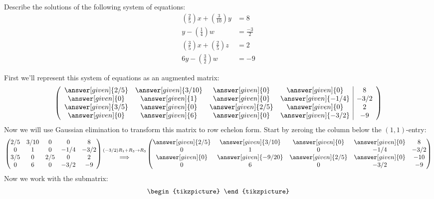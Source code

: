 \documentclass{ximera}
\begin{document}
\begin{example}
  Describe the solutions of the following system of equations:
\begin{align*}
\left(\frac{2}{5}\right)x + \left(\frac{3}{10}\right) y &= 8\\
y -\left(\frac{1}{4}\right)w &= \frac{-3}{2}\\
\left(\frac{3}{5}\right)x + \left(\frac{2}{5}\right)z &= 2\\
6y - \left(\frac{3}{2}\right)w &= -9
\end{align*}
\begin{explanation}
First we'll represent this system of equations as an augmented matrix:
\[
  \left(\begin{array}{cccc|c}
   \answer[given]{2/5}&  \answer[given]{3/10} & \answer[given]{0} &\answer[given]{0} &8 \\
  \answer[given]{0}&  \answer[given]{1} & \answer[given]{0} &\answer[given]{-1/4} & -3/2\\
  \answer[given]{3/5}&  \answer[given]{0} & \answer[given]{2/5} &\answer[given]{0} &2\\
  \answer[given]{0}&  \answer[given]{6} & \answer[given]{0} &\answer[given]{-3/2} &-9
\end{array}\right)
\]
Now we will use Gaussian elimination to transform this matrix to row echelon form. Start by zeroing the column below the $(1,1)$-entry:
\[
\begin{pmatrix}
   {2/5}&  {3/10} & {0} &{0} &8 \\
  {0}&  {1} & {0} &{-1/4} & -3/2\\
  {3/5}&  {0} & {2/5} &{0} &2\\
  {0}&  {6} & {0} &{-3/2} &-9
\end{pmatrix}
\begin{matrix}
  \scriptstyle(-3/2) R_1 + R_3\to R_3\\
  \Longrightarrow
\end{matrix}
\begin{pmatrix}
   \answer[given]{2/5}&  \answer[given]{3/10} & \answer[given]{0} &\answer[given]{0} &8 \\
  {0}&  {1} & {0} &{-1/4} & -3/2\\
  \answer[given]{0}&  \answer[given]{-9/20} & \answer[given]{2/5} &\answer[given]{0} &-10\\
  {0}&  {6} & {0} &{-3/2} &-9
\end{pmatrix}
\]
Now we work with the submatrix:
\[
\begin{tikzpicture}

\end{tikzpicture}\]
\end{explanation}
\end{example}
\end{document}
